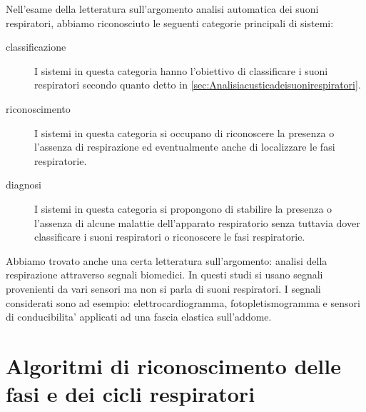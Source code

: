 
Nell'esame della letteratura sull'argomento analisi automatica dei suoni respiratori, abbiamo riconosciuto le seguenti categorie principali di sistemi:
\begin{description}
  \item[classificazione]
    I sistemi in questa categoria hanno l'obiettivo di classificare i suoni respiratori secondo quanto detto in \ref{sec:Analisiacusticadeisuonirespiratori}.
  \item[riconoscimento]
    I sistemi in questa categoria si occupano di riconoscere la presenza o l'assenza di respirazione ed eventualmente anche di localizzare le fasi respiratorie.
  \item[diagnosi]
    I sistemi in questa categoria si propongono di stabilire la presenza o l'assenza di alcune malattie dell'apparato respiratorio senza tuttavia dover classificare i suoni respiratori o riconoscere le fasi respiratorie.
\end{description}

Abbiamo trovato anche una certa letteratura sull'argomento: analisi della respirazione attraverso segnali biomedici. In questi studi si usano segnali provenienti da vari sensori ma non si parla di suoni respiratori. I segnali considerati sono ad esempio: elettrocardiogramma, fotopletismogramma e sensori di conducibilita' applicati ad una fascia elastica sull'addome.
 
% 
% 
% 


\section{Algoritmi di riconoscimento delle fasi e dei cicli respiratori}%


